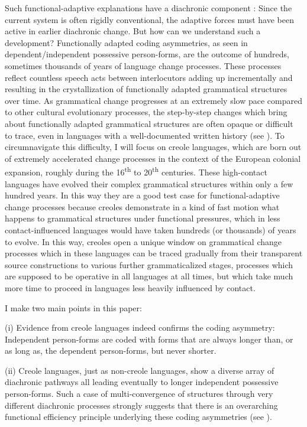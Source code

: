\documentclass[output=paper]{langsci/langscibook}
\begin{document}
Such functional-adaptive explanations have a diachronic component \citep{Bybee1988}: Since the current system is often rigidly conventional, the adaptive forces must have been active in earlier diachronic change. But how can we understand such a development? Functionally adapted coding asymmetries, as seen in dependent/independent possessive person-forms, are the outcome of hundreds, sometimes thousands of years of language change processes. These processes reflect countless speech acts between interlocutors adding up incrementally and resulting in the crystallization of functionally adapted grammatical structures over time. As grammatical change progresses at an extremely slow pace compared to other cultural evolutionary processes, the step-by-step changes which bring about functionally adapted grammatical structures are often opaque or difficult to trace, even in languages with a well-documented written history (see ). To circumnavigate this difficulty, I will focus on creole languages, which are born out of extremely accelerated change processes in the context of the European colonial expansion, roughly during the 16\textsuperscript{th} to 20\textsuperscript{th} centuries. These high-contact languages have evolved their complex grammatical structures within only a few hundred years. In this way they are a good test case for functional-adaptive change processes because creoles demonstrate in a kind of fast motion what happens to grammatical structures under functional pressures, which in less contact-influenced languages would have taken hundreds (or thousands) of years to evolve. In this way, creoles open a unique window on grammatical change processes which in these languages can be traced gradually from their transparent source constructions to various further grammaticalized stages, processes which are supposed to be operative in all languages at all times, but which take much more time to proceed in languages less heavily influenced by contact. 

I make two main points in this paper:

(i) Evidence from creole languages indeed confirms the coding asymmetry: Independent person-forms are coded with forms that are always longer than, or as long as, the dependent person-forms, but never shorter.

(ii) Creole languages, just as non-creole languages, show a diverse array of diachronic pathways all leading eventually to longer independent possessive person-forms. Such a case of multi-convergence of structures through very different diachronic processes strongly suggests that there is an overarching functional efficiency principle underlying these coding asymmetries (see ). 
\end{document}
